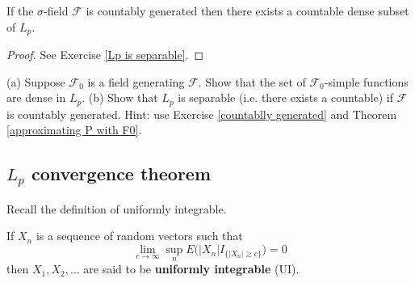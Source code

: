 \begin{theorem}[{\bf $L_p$ is separable}]
\label{Lp is separable theorem}
If the $\sigma$-field $\mathcal F$ is countably generated then there exists a countable dense subset of $L_p$.
\end{theorem}
\begin{proof}
See Exercise \ref{Lp is separable}.
\end{proof}

\begin{exercise}\label{Lp is separable}
 (a) Suppose $\mathcal F_0$ is a field generating $\mathcal F$. Show that the set of $\mathcal F_0$-simple functions are dense in $L_p$. (b) Show that $L_p$ is separable  (i.e. there exists a countable) if $\mathcal F$ is countably generated.
Hint: use Exercise \ref{countablly generated} and Theorem \ref{approximating P with F0}.
\end{exercise}



%
%
\subsection{$L_p$ convergence theorem}

Recall the definition of uniformly integrable.

\begin{definition}[{\bf UI}] If $X_n$ is a sequence of random vectors such that
\[  \lim_{c\rightarrow \infty} \sup_n E\bigl(|X_n| I_{\{|X_n| \geq c\}} \bigr)=0\]
then $X_1, X_2, \ldots$ are said to be {\bf uniformly integrable} (UI).
\end{definition}







